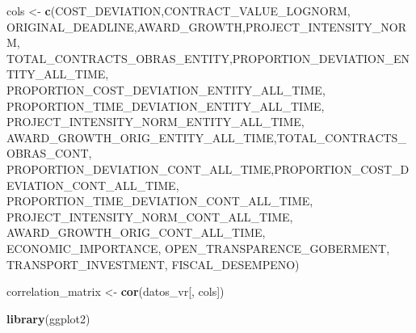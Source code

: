 \documentclass[
]{article}
\newenvironment{Shaded}{\begin{snugshade}}{\end{snugshade}}
\newcommand{\FunctionTok}[1]{\textcolor[rgb]{0.13,0.29,0.53}{\textbf{#1}}}
\newcommand{\NormalTok}[1]{#1}
\newcommand{\OtherTok}[1]{\textcolor[rgb]{0.56,0.35,0.01}{#1}}
\newcommand{\StringTok}[1]{\textcolor[rgb]{0.31,0.60,0.02}{#1}}
\begin{document}
\begin{Shaded}
\begin{Highlighting}[]
\NormalTok{cols }\OtherTok{\textless{}{-}} \FunctionTok{c}\NormalTok{(}\StringTok{\textquotesingle{}COST\_DEVIATION\textquotesingle{}}\NormalTok{,}\StringTok{\textquotesingle{}CONTRACT\_VALUE\_LOGNORM\textquotesingle{}}\NormalTok{,}
          \StringTok{\textquotesingle{}ORIGINAL\_DEADLINE\textquotesingle{}}\NormalTok{,}\StringTok{\textquotesingle{}AWARD\_GROWTH\textquotesingle{}}\NormalTok{,}\StringTok{\textquotesingle{}PROJECT\_INTENSITY\_NORM\textquotesingle{}}\NormalTok{,}
          \StringTok{\textquotesingle{}TOTAL\_CONTRACTS\_OBRAS\_ENTITY\textquotesingle{}}\NormalTok{,}\StringTok{\textquotesingle{}PROPORTION\_DEVIATION\_ENTITY\_ALL\_TIME\textquotesingle{}}\NormalTok{,}
          \StringTok{\textquotesingle{}PROPORTION\_COST\_DEVIATION\_ENTITY\_ALL\_TIME\textquotesingle{}}\NormalTok{, }\StringTok{\textquotesingle{}PROPORTION\_TIME\_DEVIATION\_ENTITY\_ALL\_TIME\textquotesingle{}}\NormalTok{,}
          \StringTok{\textquotesingle{}PROJECT\_INTENSITY\_NORM\_ENTITY\_ALL\_TIME\textquotesingle{}}\NormalTok{,}
          \StringTok{\textquotesingle{}AWARD\_GROWTH\_ORIG\_ENTITY\_ALL\_TIME\textquotesingle{}}\NormalTok{,}\StringTok{\textquotesingle{}TOTAL\_CONTRACTS\_OBRAS\_CONT\textquotesingle{}}\NormalTok{,}
          \StringTok{\textquotesingle{}PROPORTION\_DEVIATION\_CONT\_ALL\_TIME\textquotesingle{}}\NormalTok{,}\StringTok{\textquotesingle{}PROPORTION\_COST\_DEVIATION\_CONT\_ALL\_TIME\textquotesingle{}}\NormalTok{,}
          \StringTok{\textquotesingle{}PROPORTION\_TIME\_DEVIATION\_CONT\_ALL\_TIME\textquotesingle{}}\NormalTok{,}
          \StringTok{\textquotesingle{}PROJECT\_INTENSITY\_NORM\_CONT\_ALL\_TIME\textquotesingle{}}\NormalTok{, }\StringTok{\textquotesingle{}AWARD\_GROWTH\_ORIG\_CONT\_ALL\_TIME\textquotesingle{}}\NormalTok{,}
          \StringTok{\textquotesingle{}ECONOMIC\_IMPORTANCE\textquotesingle{}}\NormalTok{, }\StringTok{\textquotesingle{}OPEN\_TRANSPARENCE\_GOBERMENT\textquotesingle{}}\NormalTok{,}
          \StringTok{\textquotesingle{}TRANSPORT\_INVESTMENT\textquotesingle{}}\NormalTok{, }\StringTok{\textquotesingle{}FISCAL\_DESEMPENO\textquotesingle{}}\NormalTok{)}

\NormalTok{correlation\_matrix }\OtherTok{\textless{}{-}} \FunctionTok{cor}\NormalTok{(datos\_vr[, cols])}
\end{Highlighting}
\end{Shaded}

\begin{Shaded}
\begin{Highlighting}[]
\FunctionTok{library}\NormalTok{(ggplot2)}
\end{Highlighting}
\end{Shaded}
\end{document}
